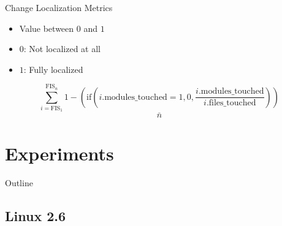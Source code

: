 
\begin{frame}{Change Localization Metrics}
  \begin{itemize}
  \item Value between $0$ and $1$
  \item $0$: Not localized at all
  \item $1$: Fully localized
  \end{itemize}


  \[
  \underline{\sum_{i = \text{FIS}_1}^{\text{FIS}_n} 1 -
    \left(\text{if}\left( i.\text{modules\_touched} = 1, 0,
        \frac{i.\text{modules\_touched}}{i.\text{files\_touched}}
      \right) \right)}
  \]
  \[
  n
  \]
\end{frame}



\section{Experiments}

\begin{frame}{Outline}
  \tableofcontents[current]
\end{frame}

\note{
}

\subsection{Linux 2.6}

